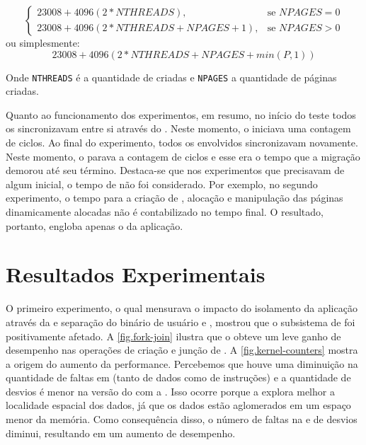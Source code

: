 \[
\begin{cases}
    23008 + 4096(2*NTHREADS),& \text{se } NPAGES= 0\\
    23008 + 4096(2*NTHREADS + NPAGES + 1),& \text{se } NPAGES > 0
\end{cases}
\]
ou simplesmente:
\begin{equation}\label{eq.3}
    23008 + 4096(2*NTHREADS + NPAGES + min(P, 1))
\end{equation}

Onde \texttt{NTHREADS} é a quantidade de \threads criadas e \texttt{NPAGES} a quantidade de páginas criadas.


Quanto ao funcionamento dos experimentos, em resumo, no início do teste todos os \clusters sincronizavam entre si através do \sync. Neste momento, o \iocluster iniciava uma contagem de ciclos. Ao final do experimento, todos os \clusters envolvidos sincronizavam novamente. Neste momento, o \iocluster parava a contagem de ciclos e esse era o tempo que a migração demorou até seu término. Destaca-se que nos experimentos que precisavam de algum \setup inicial, o tempo de \setup não foi considerado. Por exemplo, no segundo experimento, o tempo para a criação de \threads, alocação e manipulação das páginas dinamicamente alocadas não é contabilizado no tempo final. O resultado, portanto, engloba apenas o \downtime da aplicação.



\chapter{Resultados Experimentais}
\label{chap.results}


O primeiro experimento, o qual mensurava o impacto do isolamento da aplicação através da \uarea e separação do binário de usuário e , mostrou que o subsistema de \threads foi positivamente afetado. A \autoref{fig.fork-join} ilustra que o \nanvix obteve um leve ganho de desempenho nas operações de criação e junção de \threads. A \autoref{fig.kernel-counters} mostra a origem do aumento da performance. Percebemos que houve uma diminuição na quantidade de faltas em \cache (tanto de dados como de instruções) e a quantidade de desvios é menor na versão do \nanvix com a \uarea. Isso ocorre porque a \uarea explora melhor a localidade espacial dos dados, já que os dados estão aglomerados em um espaço menor da memória. Como consequência disso, o número de faltas na \cache e de desvios diminui, resultando em um aumento de desempenho.

